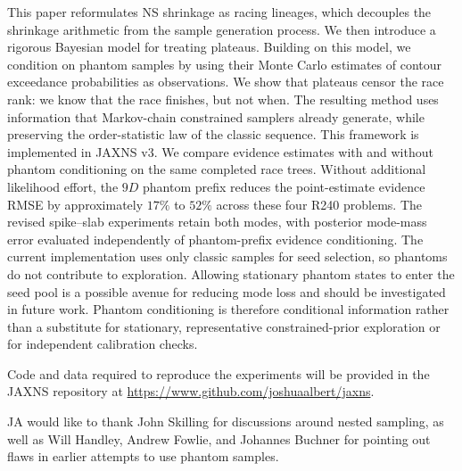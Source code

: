 \documentclass[pdflatex,sn-basic,icol]{sn-jnl}
\theoremstyle{plain}
\theoremstyle{definition}
\begin{document}
This paper reformulates NS shrinkage as racing lineages, which decouples the shrinkage arithmetic from the sample generation process.
We then introduce a rigorous Bayesian model for treating plateaus.
Building on this model, we condition on phantom samples by using their Monte Carlo estimates of contour exceedance probabilities as observations.
We show that plateaus censor the race rank: we know that the race finishes, but not when.
The resulting method uses information that Markov-chain constrained samplers already generate, while preserving the order-statistic law of the classic sequence.
This framework is implemented in JAXNS v3.
We compare evidence estimates with and without phantom conditioning on the same completed race trees.
Without additional likelihood effort, the $9D$ phantom prefix reduces the point-estimate evidence RMSE by approximately $17\%$ to $52\%$ across these four R240 problems.
The revised spike--slab experiments retain both modes, with posterior mode-mass error evaluated independently of phantom-prefix evidence conditioning.
The current implementation uses only classic samples for seed selection, so phantoms do not contribute to exploration.
Allowing stationary phantom states to enter the seed pool is a possible avenue for reducing mode loss and should be investigated in future work.
Phantom conditioning is therefore conditional information rather than a
substitute for stationary, representative constrained-prior exploration or
for independent calibration checks.

\backmatter


Code and data required to reproduce the experiments will be provided in the JAXNS repository at \url{https://www.github.com/joshuaalbert/jaxns}.


JA would like to thank John Skilling for discussions around nested sampling, as well as Will Handley, Andrew Fowlie, and Johannes Buchner for pointing out flaws in earlier attempts to use phantom samples.
\end{document}

